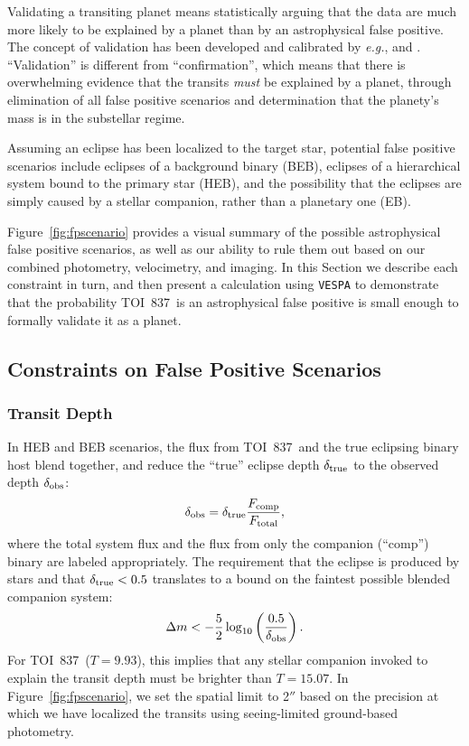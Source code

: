 \documentclass[12pt,twocolumn,tighten]{aastex63}
\newcommand{\tn}{TOI~837} %
\begin{document}
Validating a transiting planet means statistically arguing that the
data are much more likely to be explained by a planet than by an
astrophysical false positive. The concept of validation has been
developed and calibrated by {\it e.g.},
\citet{torres_modeling_2011,morton_efficient_2012,diaz_pastis_2014,santerne_pastis_2015,morton_false_2016}
and \citet{giacalone_triceratops_2020}.  ``Validation'' is different
from ``confirmation'', which means that there is overwhelming evidence
that the transits {\it must} be explained by a planet, through
elimination of all false positive scenarios and determination that the
planety's mass is in the substellar regime.

Assuming an eclipse has been localized to the target star, potential
false positive scenarios include eclipses of a background binary
(BEB), eclipses of a hierarchical system bound to the primary star
(HEB), and the possibility that the eclipses are simply caused by a
stellar companion, rather than a planetary one (EB).

Figure~\ref{fig:fpscenario} provides a visual summary of the possible
astrophysical false positive scenarios, as well as our ability to rule
them out based on our combined photometry, velocimetry, and imaging.
In this Section we describe each constraint in turn, and then present
a calculation using \texttt{VESPA} \citep{morton_efficient_2012} to
demonstrate that the probability \tn\ is an astrophysical false
positive is small enough to formally validate it as a planet.



\subsection{Constraints on False Positive Scenarios}
\label{subsec:fp_constraints}

\subsubsection{Transit Depth}
In HEB and BEB scenarios, the flux from \tn\ and the true eclipsing
binary host blend together, and reduce the ``true'' eclipse depth
$\delta_{\rm true}$ to the observed depth
$\delta_{\rm obs}$:
\begin{equation}
  \delta_{\rm obs}
  = 
  \delta_{\rm true} \frac{F_{\rm comp}}{F_{\rm total}},
\end{equation}
where the total system flux and the flux from only the companion
(``comp'') binary are labeled appropriately.  The requirement that the
eclipse is produced by stars and that $\delta_{\rm true} < 0.5$
translates to a bound on the faintest possible blended companion
system:
\begin{equation}
  \Delta m < -\frac{5}{2} \log_{10}
             \left( \frac{0.5}{\delta_{\rm obs}} \right).
\end{equation}
For \tn\ ($T=9.93$), this implies that any stellar companion invoked
to explain the transit depth must be brighter than $T=15.07$.  In
Figure~\ref{fig:fpscenario}, we set the spatial limit to 2$''$ based
on the precision at which we have localized the transits using
seeing-limited ground-based photometry.
\end{document}
